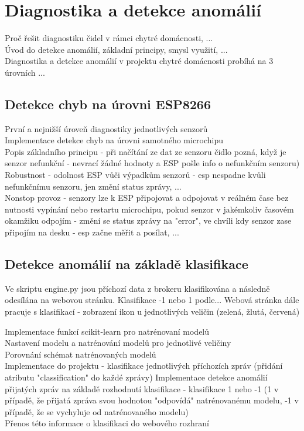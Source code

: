 \chapter{Diagnostika a detekce anomálií} \label{chap:methods}

Proč řešit diagnostiku čidel v rámci chytré domácnosti, ... \\
Úvod do detekce anomálií, základní principy, smysl využití, ... \\
Diagnostika a detekce anomálií v projektu chytré domácnosti probíhá na 3 úrovních ... \\

\section{Detekce chyb na úrovni ESP8266} \label{sec:error_detection_esp}

První a nejnižší úroveň diagnostiky jednotlivých senzorů \\
Implementace detekce chyb na úrovni samotného microchipu \\
Popis základního principu - při načítání ze dat ze senzoru čidlo pozná, když je senzor nefunkční - nevrací  žádné hodnoty a ESP pošle info o nefunkčním senzoru) \\
Robustnost - odolnost ESP vůči výpadkům senzorů - esp nespadne kvůli nefunkčnímu senzoru, jen změní status zprávy, ... \\
Nonstop provoz - senzory lze k ESP připojovat a odpojovat v reálném čase bez nutnosti vypínání nebo restartu microchipu, pokud senzor v jakémkoliv časovém okamžiku odpojím - změní se status zprávy na "error", ve chvíli kdy senzor zase připojím na desku - esp začne měřit a posílat, ... \\

\section{Detekce anomálií na základě klasifikace} \label{sec:detection_classification}

Ve skriptu engine.py jsou příchozí data z brokeru klasifikována a následně odesílána na webovou stránku. Klasifikace -1 nebo 1 podle... Webová stránka dále pracuje s klasifikací - zobrazení ikon u jednotlivých veličin (zelená, žlutá, červená)


Implementace funkcí scikit-learn pro natrénovaní modelů \\
Nastavení modelu a natrénování modelů pro jednotlivé veličiny \\
Porovnání schémat natrénovaných modelů \\
Implementace do projektu - klasifikace jednotlivých příchozích zpráv (přidání atributu "classification" do každé zprávy)
Implementace detekce anomálií přijatých zpráv na základě rozhodnutí klasifikace - klasifikace 1 nebo -1 (1 v případě, že přijatá zpráva svou hodnotou "odpovídá" natrénovanému modelu, -1 v případě, že se vychyluje od natrénovaného modelu) \\
Přenos této informace o klasifikaci do webového rozhraní \\


